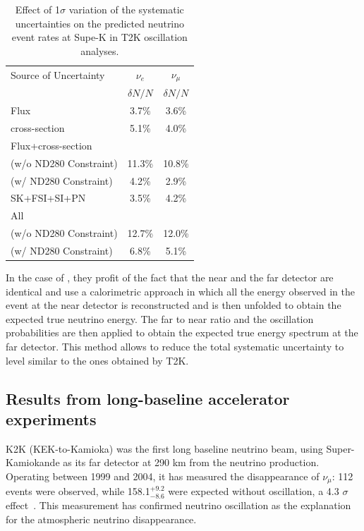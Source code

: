 \begin{table}[htb]
\begin{center}
\begin{tabular}{l c c } \hline \hline
Source of Uncertainty& $\nu_e$ & $\nu_{\mu}$ \\ 
 &$\delta N/N$&$\delta N/N$\\ \hline
Flux&3.7\%& 3.6\% \\ \hline
cross-section &5.1\%& 4.0\% \\ \hline
Flux+cross-section&& \\
(w/o ND280 Constraint)&11.3\% &10.8\% \\
(w/ ND280 Constraint)&4.2\% &2.9\% \\ \hline
SK+FSI+SI+PN& 3.5\%& 4.2\% \\ \hline
All & & \\
(w/o ND280 Constraint)& 12.7\%& 12.0\% \\ 
(w/ ND280 Constraint)& 6.8\%& 5.1\% \\ \hline \hline
\end{tabular}
\caption{Effect of 1$\sigma$ variation of the systematic uncertainties on the predicted neutrino event rates at Supe-K in T2K oscillation analyses.}
\label{tab:t2ksyst}
\end{center}
\end{table}


In the case of \nova, they profit of the fact that the near and the far detector are identical and use a calorimetric approach in which all the energy observed in the event at the near detector is reconstructed and is then unfolded to obtain the expected true neutrino energy. The far to near ratio and the oscillation probabilities are then applied to obtain the expected true energy spectrum at the far detector. This method allows to reduce the total systematic uncertainty to level similar to the ones obtained by T2K.

\subsection{Results from long-baseline accelerator experiments}

K2K (KEK-to-Kamioka) was the first long baseline neutrino beam, using Super-Kamiokande as its far detector at 290 km from the neutrino production. Operating between 1999 and 2004, it has measured the disappearance of $\nu_\mu$: 112 events were observed, while 158.1$^{+9.2}_{-8.6}$ were expected without oscillation, a 4.3 $\sigma$ effect~\cite{Ahn:2006zza}. This measurement has confirmed neutrino oscillation as the explanation for the atmospheric neutrino disappearance. 

